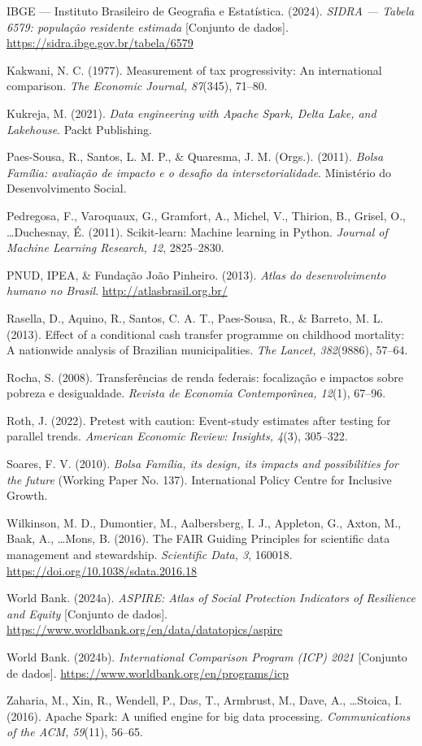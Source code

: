 \documentclass[12pt,a4paper,oneside]{article}
\begin{document}
\begin{singlespace}
 IBGE --- Instituto Brasileiro de Geografia e Estatística. (2024). \textit{SIDRA --- Tabela 6579: população residente estimada} [Conjunto de dados]. \url{https://sidra.ibge.gov.br/tabela/6579}

 Kakwani, N. C. (1977). Measurement of tax progressivity: An international comparison. \textit{The Economic Journal, 87}(345), 71--80.

 Kukreja, M. (2021). \textit{Data engineering with Apache Spark, Delta Lake, and Lakehouse}. Packt Publishing.

 Paes-Sousa, R., Santos, L. M. P., \& Quaresma, J. M. (Orgs.). (2011). \textit{Bolsa Família: avaliação de impacto e o desafio da intersetorialidade}. Ministério do Desenvolvimento Social.

 Pedregosa, F., Varoquaux, G., Gramfort, A., Michel, V., Thirion, B., Grisel, O., \ldots Duchesnay, É. (2011). Scikit-learn: Machine learning in Python. \textit{Journal of Machine Learning Research, 12}, 2825--2830.

 PNUD, IPEA, \& Fundação João Pinheiro. (2013). \textit{Atlas do desenvolvimento humano no Brasil}. \url{http://atlasbrasil.org.br/}

 Rasella, D., Aquino, R., Santos, C. A. T., Paes-Sousa, R., \& Barreto, M. L. (2013). Effect of a conditional cash transfer programme on childhood mortality: A nationwide analysis of Brazilian municipalities. \textit{The Lancet, 382}(9886), 57--64.

 Rocha, S. (2008). Transferências de renda federais: focalização e impactos sobre pobreza e desigualdade. \textit{Revista de Economia Contemporânea, 12}(1), 67--96.

 Roth, J. (2022). Pretest with caution: Event-study estimates after testing for parallel trends. \textit{American Economic Review: Insights, 4}(3), 305--322.

 Soares, F. V. (2010). \textit{Bolsa Família, its design, its impacts and possibilities for the future} (Working Paper No. 137). International Policy Centre for Inclusive Growth.

 Wilkinson, M. D., Dumontier, M., Aalbersberg, I. J., Appleton, G., Axton, M., Baak, A., \ldots Mons, B. (2016). The FAIR Guiding Principles for scientific data management and stewardship. \textit{Scientific Data, 3}, 160018. \url{https://doi.org/10.1038/sdata.2016.18}

 World Bank. (2024a). \textit{ASPIRE: Atlas of Social Protection Indicators of Resilience and Equity} [Conjunto de dados]. \url{https://www.worldbank.org/en/data/datatopics/aspire}

 World Bank. (2024b). \textit{International Comparison Program (ICP) 2021} [Conjunto de dados]. \url{https://www.worldbank.org/en/programs/icp}

 Zaharia, M., Xin, R., Wendell, P., Das, T., Armbrust, M., Dave, A., \ldots Stoica, I. (2016). Apache Spark: A unified engine for big data processing. \textit{Communications of the ACM, 59}(11), 56--65.
\end{singlespace}
\end{document}
